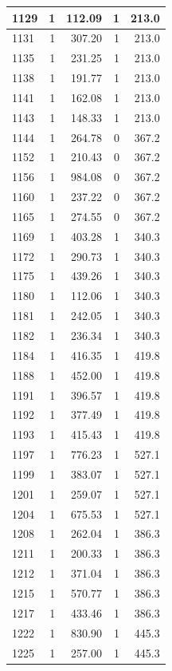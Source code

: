 \documentclass[
  12pt,
]{book}
\begin{document}
\begin{tabular}{l|r|r|r|r}
\hline
1129 & 1 & 112.09 & 1 & 213.0\\
\hline
1131 & 1 & 307.20 & 1 & 213.0\\
\hline
1135 & 1 & 231.25 & 1 & 213.0\\
\hline
1138 & 1 & 191.77 & 1 & 213.0\\
\hline
1141 & 1 & 162.08 & 1 & 213.0\\
\hline
1143 & 1 & 148.33 & 1 & 213.0\\
\hline
1144 & 1 & 264.78 & 0 & 367.2\\
\hline
1152 & 1 & 210.43 & 0 & 367.2\\
\hline
1156 & 1 & 984.08 & 0 & 367.2\\
\hline
1160 & 1 & 237.22 & 0 & 367.2\\
\hline
1165 & 1 & 274.55 & 0 & 367.2\\
\hline
1169 & 1 & 403.28 & 1 & 340.3\\
\hline
1172 & 1 & 290.73 & 1 & 340.3\\
\hline
1175 & 1 & 439.26 & 1 & 340.3\\
\hline
1180 & 1 & 112.06 & 1 & 340.3\\
\hline
1181 & 1 & 242.05 & 1 & 340.3\\
\hline
1182 & 1 & 236.34 & 1 & 340.3\\
\hline
1184 & 1 & 416.35 & 1 & 419.8\\
\hline
1188 & 1 & 452.00 & 1 & 419.8\\
\hline
1191 & 1 & 396.57 & 1 & 419.8\\
\hline
1192 & 1 & 377.49 & 1 & 419.8\\
\hline
1193 & 1 & 415.43 & 1 & 419.8\\
\hline
1197 & 1 & 776.23 & 1 & 527.1\\
\hline
1199 & 1 & 383.07 & 1 & 527.1\\
\hline
1201 & 1 & 259.07 & 1 & 527.1\\
\hline
1204 & 1 & 675.53 & 1 & 527.1\\
\hline
1208 & 1 & 262.04 & 1 & 386.3\\
\hline
1211 & 1 & 200.33 & 1 & 386.3\\
\hline
1212 & 1 & 371.04 & 1 & 386.3\\
\hline
1215 & 1 & 570.77 & 1 & 386.3\\
\hline
1217 & 1 & 433.46 & 1 & 386.3\\
\hline
1222 & 1 & 830.90 & 1 & 445.3\\
\hline
1225 & 1 & 257.00 & 1 & 445.3\\

\end{tabular}
\end{document}
